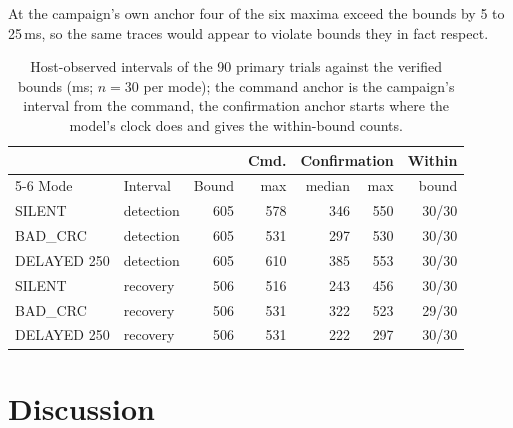 \documentclass[conference,a4paper]{IEEEtran}
\begin{document}
At the campaign's own anchor four of the six maxima exceed the bounds by 5 to 25\,ms, so the same traces would appear to violate bounds they in fact respect.

\begin{table}[t]
\centering\footnotesize
\caption{Host-observed intervals of the 90 primary trials against the verified bounds (ms; $n=30$ per mode); the command anchor is the campaign's interval from the command, the confirmation anchor starts where the model's clock does and gives the within-bound counts.}
\label{tab:desc}
\setlength{\tabcolsep}{3.5pt}
\begin{tabular}{@{}llrrrrr@{}}
\toprule
& & & Cmd. & \multicolumn{2}{c}{Confirmation} & Within \\
\cmidrule(lr){5-6}
Mode & Interval & Bound & max & median & max & bound \\
\midrule
SILENT      & detection & 605 & 578 & 346 & 550 & 30/30 \\
BAD\_CRC    & detection & 605 & 531 & 297 & 530 & 30/30 \\
DELAYED 250 & detection & 605 & 610 & 385 & 553 & 30/30 \\
SILENT      & recovery  & 506 & 516 & 243 & 456 & 30/30 \\
BAD\_CRC    & recovery  & 506 & 531 & 322 & 523 & 29/30 \\
DELAYED 250 & recovery  & 506 & 531 & 222 & 297 & 30/30 \\
\bottomrule
\end{tabular}
\end{table}

\section{Discussion}
\label{sec:discussion}
\end{document}
